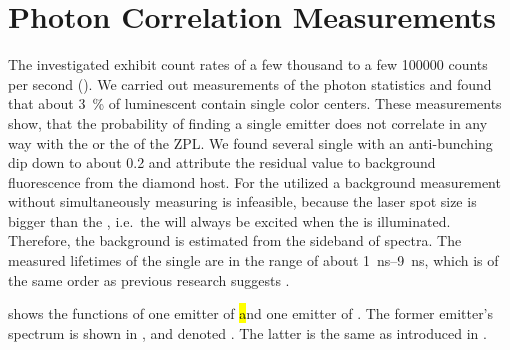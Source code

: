 
	\section{Photon Correlation Measurements} \label{subsec::g2}

		The investigated \sivs exhibit count rates of a few thousand to a few \num{100000} counts per second (\SI{}{\cps}).
		We carried out measurements of the photon statistics and found that about \SI{3}{\percent} of luminescent \nds contain single color centers.
		These measurements show, that the probability of finding a single emitter does not correlate in any way with the \cwl or the \lw of the ZPL.
		We found several single \sivs with an anti-bunching dip down to about \num{0.2} and attribute the residual \gtz value to background fluorescence from the diamond host.
		For the utilized \nds a background measurement without simultaneously measuring \siv \pl is infeasible, because the laser spot size is bigger than the \nd, i.e.\ the \siv will always be excited when the \nd is illuminated.
		Therefore, the background is estimated from the sideband of \siv spectra.
		The measured lifetimes of the single \sivs are in the range of about \SIrange{1}{9}{\ns}, which is of the same order as previous research suggests \cite{Sipahigil2014,Sternschulte1994}.

		 shows the \gt functions of one emitter of \hl and one emitter of \vl.
		The former emitter's spectrum is shown in , and denoted \emhtwo. The latter is the same as \embroad introduced in .

